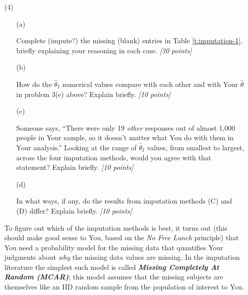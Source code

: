 \documentclass[12pt]{article}
\begin{document}
\begin{itemize}
\begin{table}[t!]
\end{table}
\item[(4)]

\begin{itemize}

\item[(a)]

Complete (impute?) the missing (blank) entries in Table \ref{t:imputation-1}, briefly explaining your reasoning in each case. \textit{[30 points]}

\vspace*{1.5in}

\item[(b)]

How do the $\hat{ \theta }_I$ numerical values compare with each other and with Your $\hat{ \theta }$ in problem 3(e) above? Explain briefly. \textit{[10 points]}

\vspace*{1.0in}

\item[(c)]

Someone says, ``There were only 19 \textit{other} responses out of almost 1,000 people in Your sample, so it doesn't matter what You do with them in Your analysis.'' Looking at the range of $\hat{ \theta }_I$ values, from smallest to largest, across the four imputation methods, would you agree with that statement? Explain briefly. \textit{[10 points]}

\vspace*{1.0in}

\item[(d)]

In what ways, if any, do the results from imputation methods (C) and (D) differ? Explain briefly. \textit{[10 points]}

\vspace*{1.0in}

\end{itemize}

To figure out which of the imputation methods is best, it turns out (this should make good sense to You, based on the \textit{No Free Lunch} principle) that You need a probability model for the missing data that quantifies Your judgments about \textit{why} the missing data values are missing. In the imputation literature the simplest such model is called \textbf{\textit{Missing Completely At Random (MCAR)}}; this model assumes that the missing subjects are themselves like an IID random sample from the population of interest to You.


\end{itemize}
\end{document}
